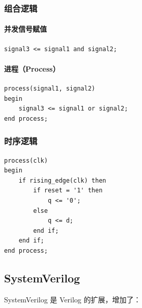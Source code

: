 \subsubsection{组合逻辑}

\paragraph{并发信号赋值}

\begin{verbatim}
signal3 <= signal1 and signal2;
\end{verbatim}

\paragraph{进程（Process）}

\begin{verbatim}
process(signal1, signal2)
begin
    signal3 <= signal1 or signal2;
end process;
\end{verbatim}

\subsubsection{时序逻辑}

\begin{verbatim}
process(clk)
begin
    if rising_edge(clk) then
        if reset = '1' then
            q <= '0';
        else
            q <= d;
        end if;
    end if;
end process;
\end{verbatim}

\subsection{SystemVerilog}

SystemVerilog 是 Verilog 的扩展，增加了：

